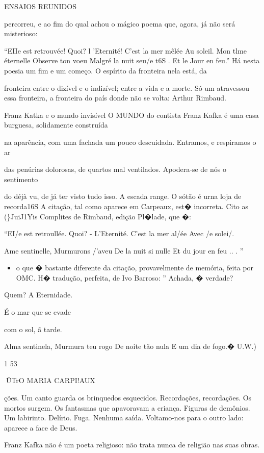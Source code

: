 ENSAIOS REUNIDOS

percorreu, e ao fim do qual achou o mágico poema que, agora, já não será
misterioso:

``EIIe est retrouvée! Quoi? l 'Eternité! C'est la mer mêlée Au soleil.
Mon tlme éternelle Observe ton voeu Malgré la nuit seu/e t6S . Et le
Jour en feu.'' Há nesta poesia um fim e um começo. O espírito da
fronteira nela está, da

fronteira entre o dizível e o indizível; entre a vida e a morte. Só um
atravessou essa fronteira, a fronteira do país donde não se volta:
Arthur Rimbaud.

Franz Katka e o mundo invisível O MUNDO do contista Franz Kafka é uma
casa burguesa, solidamente construída

na aparência, com uma fachada um pouco descuidada. Entramos, e
respiramos o ar

das penúrias dolorosas, de quartos mal ventilados. Apodera-se de nós o
sentimento

do déjà vu, de já ter visto tudo isso. A escada range. O sótão é urna
loja de recorda16S A citação, tal como aparece em Carpeaux, est�
incorreta. Cito as (\}JuiJ1Yis Complites de Rimbaud, edição Pl�lade, que
�:

``EI/e est retroullée. Quoi? - L'Eternité. C'est la mer al/ée Avec /e
solei/.

Ame sentinelle, Murmurons /'aveu De la nuit si nulle Et du jour en feu
.. . ''

\begin{itemize}
\tightlist
\item
  o que � bastante diferente da citação, provavelmente de memória, feita
  por OMC. H� tradução, perfeita, de Ivo Barroso: '' Achada, � verdade?
\end{itemize}

Quem? A Eternidade.

É o mar que se evade

com o sol, ã tarde.

Alma sentinela, Murmura teu rogo De noite tão nula E um dia de fogo.�
U.W.)

1 53

ÜTrO MARIA CARPI!AUX

ções. Um canto guarda os brinquedos esquecidos. Recordações,
recordações. Os mortos surgem. Os fantasmas que apavoravam a criança.
Figuras de demônios. Um labirinto. Delírio. Fuga. Nenhuma saída.
Voltamo-nos para o outro lado: aparece a face de Deus.

Franz Kafka não é um poeta religioso: não trata nunca de religião nas
suas obras.

